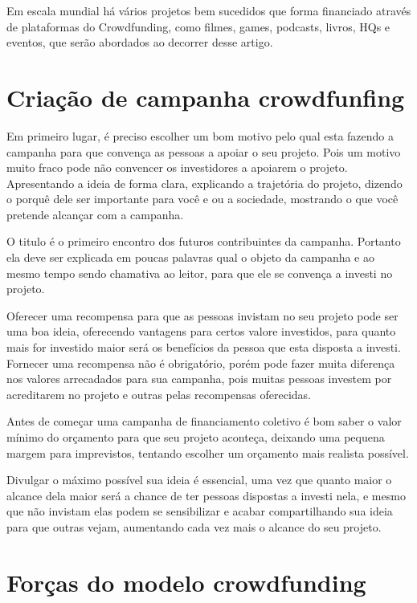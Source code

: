 \documentclass{classe_cn}                 %
\begin{document}
Em escala mundial há vários projetos bem sucedidos que forma financiado através de plataformas do Crowdfunding, como filmes, games, podcasts, livros, HQs e eventos, que serão abordados ao decorrer desse artigo.

\section{Criação de campanha crowdfunfing}

Em primeiro lugar, é preciso escolher um bom motivo pelo qual esta fazendo a campanha para que convença as pessoas a apoiar o seu projeto. Pois um motivo muito fraco pode não convencer os investidores a apoiarem o projeto. Apresentando a ideia de forma clara, explicando a trajetória do projeto, dizendo o porquê dele ser importante para você e ou a sociedade, mostrando o que você pretende alcançar com a campanha.

O titulo é o primeiro encontro dos futuros contribuintes da campanha. Portanto ela deve ser explicada em poucas palavras qual o objeto da campanha e ao mesmo tempo sendo chamativa ao leitor, para que ele se convença a investi no projeto.

Oferecer uma recompensa para que as pessoas invistam no seu projeto pode ser uma boa ideia, oferecendo vantagens para certos valore investidos, para quanto mais for investido maior será os benefícios da pessoa que esta disposta a investi. Fornecer uma recompensa não é obrigatório, porém pode fazer muita diferença nos valores arrecadados para sua campanha, pois muitas pessoas investem por acreditarem no projeto e outras pelas recompensas oferecidas.

Antes de começar uma campanha de financiamento coletivo é bom saber o valor mínimo do orçamento para que seu projeto aconteça, deixando uma pequena margem para imprevistos, tentando escolher um orçamento mais realista possível.

Divulgar o máximo possível sua ideia é essencial, uma vez que quanto maior o alcance dela maior será a chance de ter pessoas dispostas a investi nela, e mesmo que não invistam elas podem se sensibilizar e acabar compartilhando sua ideia para que outras vejam, aumentando cada vez mais o alcance do seu projeto. \cite{XAVIER:2016}
\section{Forças do modelo crowdfunding}
\end{document}
